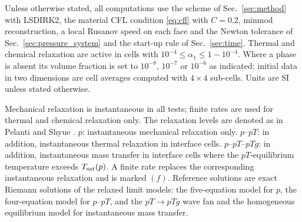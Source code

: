 \documentclass[a4paper,fleqn]{cas-sc}
\begin{document}
Unless otherwise stated, all computations use the scheme of Sec.~\ref{sec:method} with LSDIRK2, the material CFL condition
\eqref{eq:cfl} with $C=0.2$, minmod reconstruction, a local Rusanov speed on each face and the Newton tolerance of
Sec.~\ref{sec:pressure_system} and the start-up rule of Sec.~\ref{sec:time}. Thermal and chemical relaxation
are active in cells with $10^{-4}\le\alpha_1\le1-10^{-4}$. Where a phase is absent its volume fraction is set to $10^{-8}$, $10^{-7}$ or
$10^{-6}$ as indicated; initial data in two dimensions are cell averages computed with $4\times4$ sub-cells. Units are SI
unless stated otherwise.

Mechanical relaxation is instantaneous in all tests; finite rates are used for thermal and chemical relaxation only.
The relaxation levels are denoted as in Pelanti and Shyue \cite{PelantiShyue2014}. $p$: instantaneous mechanical relaxation only.
$p$--$pT$: in addition, instantaneous thermal relaxation in interface cells. $p$--$pT$--$pTg$: in addition, instantaneous
mass transfer in interface cells where the $pT$-equilibrium temperature exceeds $T_{\rm sat}(p)$. A finite rate replaces the
corresponding instantaneous relaxation and is marked $(f)$. Reference solutions are exact Riemann solutions of the
relaxed limit models: the five-equation model for $p$, the four-equation model for $p$--$pT$, and the $pT\to pTg$ wave
fan and the homogeneous equilibrium model for instantaneous mass transfer.

\end{document}
